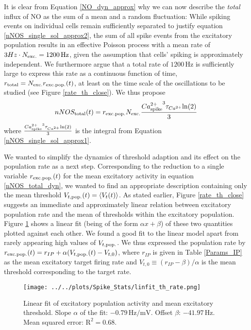 \documentclass[10pt,a4paper]{article}
\begin{document}
It is clear from Equation \eqref{NO_dyn_approx} why we can now describe the \emph{total} influx of NO as the sum of a mean and a random fluctuation: While spiking events on individual cells remain sufficiently separated to justify equation \eqref{nNOS_single_sol_approx2}, the sum of all spike events from the excitatory population results in an effective Poisson process with a mean rate of $3 Hz \cdot N_{\rm exc.} = \mathrm{1200\,Hz}$, given the assumption that cells' spiking is approximately independent. We furthermore argue that a total rate of $\mathrm{1200\,Hz}$ is sufficiently large to express this rate as a continuous function of time, $r_{\rm total} = N_{\rm exc.} r_{\rm exc.pop.}(t)$, at least on the time scale of the oscillations to be studied (see  Figure \ref{rate_th_close}). We thus propose
\begin{equation}
nNOS_{\rm total}(t) = r_{\rm exc.pop.} N_{\rm exc.}\frac{{Ca^{2+}_{\rm spike}}^3 \tau_{Ca^{2+}} \mathrm{ln} (2)}{3}
\label{nNOS_total_dyn}
\end{equation} 
where $\frac{{Ca^{2+}_{\rm spike}}^3 \tau_{Ca^{2+}} \mathrm{ln} (2)}{3}$ is the integral from Equation \eqref{nNOS_single_sol_approx1}.

We wanted to simplify the dynamics of threshold adaption and its effect on the population rate as a next step. Corresponding to the reduction to a single variable $r_{\rm exc.pop.}(t)$ for the mean excitatory activity in equation \eqref{nNOS_total_dyn}, we wanted to find an appropriate description containing only the mean threshold $V_{t,\rm pop.}(t) = \langle V_t(t) \rangle$. As stated earlier, Figure \ref{rate_th_close} suggests an immediate and approximately linear relation between excitatory population rate and the mean of thresholds within the excitatory population. Figure \ref{thresh_r_linfit} shows a linear fit (being of the form $\alpha x + \beta$) of these two quantities plotted against each other. We found a good fit to the linear model apart from rarely appearing high values of $V_{t,\rm pop.}$. We thus expressed the population rate by $r_{\rm exc.pop.}(t) = r_{IP} + \alpha(V_{t,\rm pop.}(t)-V_{t,0})$, where $r_{IP}$ is given in Table \ref{Params_IP} as the mean excitatory target firing rate and $V_{t,0} \equiv (r_{IP}-\beta)/\alpha$ is the mean threshold corresponding to the target rate.
\begin{figure}
\texttt{[image: ../../plots/Spike\_Stats/linfit\_th\_rate.png]}
\caption{Linear fit of excitatory population activity and mean excitatory threshold. Slope $\alpha$ of the fit: $\mathrm{-0.79\, Hz/mV}$. Offset $\beta$: $\mathrm{-41.97\, Hz}$. Mean squared error: $\mathrm{R^2 = 0.68}$.}
\label{thresh_r_linfit}
\end{figure}
\end{document}
